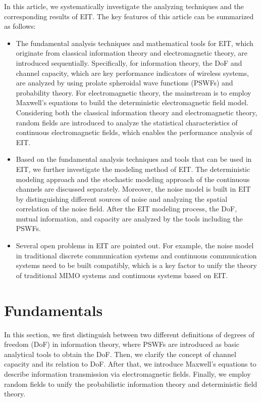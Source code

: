\documentclass[journal,twocolumn]{IEEEtran}
\begin{document}
In this article, we systematically investigate the analyzing techniques and the corresponding results of EIT. The key features of this article can be summarized as follows:
\begin{itemize}
\item{The fundamental analysis techniques and mathematical tools for EIT, which originate from classical information theory and electromagnetic theory, are introduced sequentially. Specifically, for information theory, the DoF and channel capacity, which are key performance indicators of wireless systems, are analyzed by using prolate spheroidal wave functions (PSWFs) and probability theory. For electromagnetic theory, the mainstream is to employ Maxwell's equations to build the deterministic electromagnetic field model. Considering both the classical information theory and electromagnetic theory, random fields are introduced to analyze the statistical characteristics of continuous electromagnetic fields, which enables the performance analysis of EIT. }
\item{Based on the fundamental analysis techniques and tools that can be used in EIT, we further investigate the modeling method of EIT. The deterministic modeling approach and the stochastic modeling approach of the continuous channels are discussed separately. Moreover, the noise model is built in EIT by distinguishing different sources of noise and analyzing the spatial correlation of the noise field. After the EIT modeling process, the DoF, mutual information, and capacity are analyzed by the tools including the PSWFs.} 
\item{Several open problems in EIT are pointed out. For example, the noise model in traditional discrete communication systems and continuous communication systems need to be built compatibly, which is a key factor to unify the theory of traditional MIMO systems and continuous systems based on EIT.}
\end{itemize}

\section{Fundamentals}
In this section, we first distinguish between two different definitions of degrees of freedom (DoF) in information theory, where PSWFs are introduced as basic analytical tools to obtain the DoF. 
Then, we clarify the concept of channel capacity and its relation to DoF. 
After that, we introduce Maxwell's equations to describe information transmission via electromagnetic fields. 
Finally, we employ random fields to unify the probabilistic information theory and deterministic field theory. 
\end{document}
